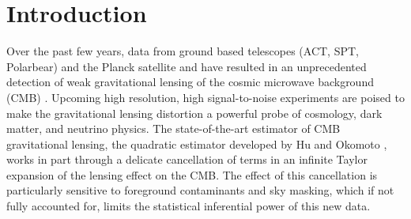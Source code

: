 \documentclass[iop,revtex4,apj,onecolumn]{emulateapj}
\begin{document}
\begin{abstract}
\end{abstract}




\section{Introduction}

 Over the past few years, data from ground based telescopes (ACT, SPT, Polarbear) and the Planck satellite and have resulted in an unprecedented detection of weak gravitational lensing of the cosmic microwave background (CMB) \citep{das2011detection,van2012measurement,planck2013lensing,Polarbear2014,planck2015lensing}.  Upcoming high resolution, high signal-to-noise experiments are poised to    make the gravitational lensing distortion  a  powerful probe of cosmology, dark matter, and neutrino physics. The state-of-the-art estimator of CMB gravitational lensing, the quadratic estimator developed by Hu and Okomoto \citep{hu2001mapping,hu2002mass}, works in part through a delicate cancellation of terms in an infinite Taylor expansion of the lensing effect on the CMB. The effect of this cancellation is particularly sensitive to foreground contaminants and sky masking, which  if not fully accounted for,  limits  the statistical inferential power of this new data.  
\end{document}
